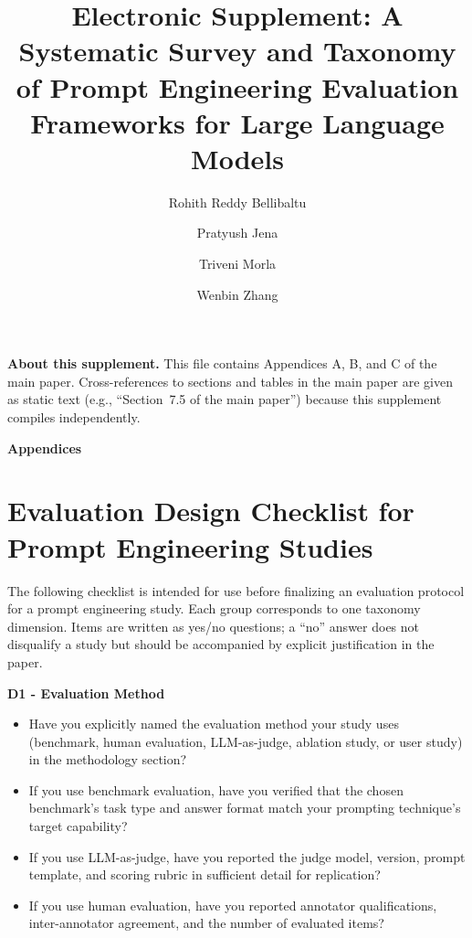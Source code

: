 \documentclass[acmsmall, nonacm, screen]{acmart}
\title{Electronic Supplement: A Systematic Survey and Taxonomy of Prompt Engineering
Evaluation Frameworks for Large Language Models}
\author{Rohith Reddy Bellibaltu}
\affiliation{%
  \institution{Florida International University}
  \city{Miami}
  \state{Florida}
  \country{USA}
}
\author{Pratyush Jena}
\affiliation{%
  \institution{Florida International University}
  \city{Miami}
  \state{Florida}
  \country{USA}
}
\author{Triveni Morla}
\affiliation{%
  \institution{Florida International University}
  \city{Miami}
  \state{Florida}
  \country{USA}
}
\author{Wenbin Zhang}
\affiliation{%
  \institution{Florida International University}
  \city{Miami}
  \state{Florida}
  \country{USA}
}
\begin{document}

\maketitle

\noindent\textbf{About this supplement.} This file contains Appendices A, B, and C
of the main paper. Cross-references to sections and tables in the main
paper are given as static text (e.g., ``Section~7.5 of the main
paper'') because this supplement compiles independently.

\appendix
\renewcommand{\thetable}{\Alph{section}.\arabic{table}}

\begingroup
  \par\vspace{2ex}
  \begin{center}
    {\Large\bfseries Appendices}
  \end{center}
  \par\vspace{1ex}
\endgroup

\section{Evaluation Design Checklist for Prompt Engineering Studies}
\label{app:checklist}

The following checklist is intended for use before finalizing an evaluation
protocol for a prompt engineering study. Each group corresponds to one
taxonomy dimension. Items are written as yes/no questions; a ``no'' answer
does not disqualify a study but should be accompanied by explicit
justification in the paper.

\textbf{D1 - Evaluation Method}
\begin{itemize}
  \item Have you explicitly named the evaluation method your study uses
        (benchmark, human evaluation, LLM-as-judge, ablation study, or
        user study) in the methodology section?
  \item If you use benchmark evaluation, have you verified that the chosen
        benchmark's task type and answer format match your prompting
        technique's target capability?
  \item If you use LLM-as-judge, have you reported the judge model,
        version, prompt template, and scoring rubric in sufficient detail
        for replication?
  \item If you use human evaluation, have you reported annotator
        qualifications, inter-annotator agreement, and the number of
        evaluated items?
\end{itemize}
\end{document}
